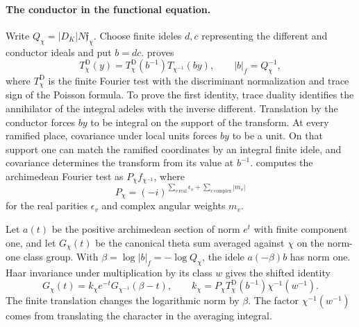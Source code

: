 \documentclass[11pt]{amsart}
\theoremstyle{definition}
\theoremstyle{remark}
\numberwithin{equation}{section}
\begin{document}
\paragraph{The conductor in the functional equation.}
Write \(Q_\chi=|D_K|N\mathfrak f_\chi\). Choose finite ideles \(d,c\)
representing the different and conductor ideals and put \(b=dc\).
 proves
\[
   T_\chi^{\mathrm D}(y)
      =T_\chi^{\mathrm D}(b^{-1})T_{\chi^{-1}}(by),
   \qquad |b|_f=Q_\chi^{-1},
\]
where \(T_\chi^{\mathrm D}\) is the finite Fourier test with the
discriminant normalization and trace sign of the Poisson formula.
To prove the first identity, trace duality identifies the annihilator
of the integral adeles with the inverse different. Translation by
the conductor forces \(by\) to be integral on the support of the
transform. At every ramified place, covariance under local units
forces \(by\) to be a unit. On that support one can match the
ramified coordinates by an integral finite idele, and covariance
determines the transform from its value at \(b^{-1}\).
 computes the archimedean
Fourier test as \(P_\chi f_{\chi^{-1}}\), where
\[
  P_\chi=(-i)^{\sum_{v\ \mathrm{real}}\epsilon_v
                       +\sum_{v\ \mathrm{complex}}|m_v|}
\]
for the real parities \(\epsilon_v\) and complex angular weights \(m_v\).

Let \(a(t)\) be the positive archimedean section of norm \(e^t\)
with finite component one, and let \(G_\chi(t)\) be the canonical
theta sum averaged against \(\chi\) on the norm-one class group.
With \(\beta=\log|b|_f=-\log Q_\chi\), the idele \(a(-\beta)b\)
has norm one. Haar invariance under multiplication by its class \(w\)
gives the shifted identity
\[
  G_\chi(t)=k_\chi e^{-t}G_{\chi^{-1}}(\beta-t),\qquad
  k_\chi=P_\chi T_\chi^{\mathrm D}(b^{-1})\chi^{-1}(w^{-1}).
\]
The finite translation changes the logarithmic norm by \(\beta\).
The factor \(\chi^{-1}(w^{-1})\) comes from translating the
character in the averaging integral.
\end{document}

